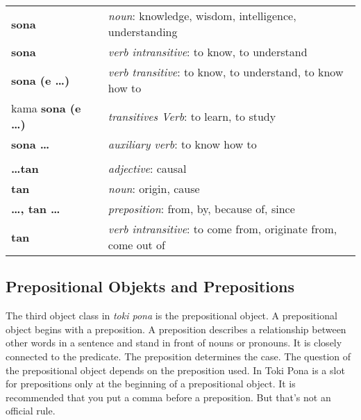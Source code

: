 \begin{supertabular}{p{2,5cm}|ll}
    \textbf{sona}                &  & \textit{noun}: knowledge, wisdom, intelligence, understanding                 \\
    \textbf{sona}                &  & \textit{verb intransitive}: to know, to understand                            \\
    \textbf{sona (e \dots)}      &  & \textit{verb transitive}: to know, to understand, to know how to              \\
    kama \textbf{sona (e \dots)} &  & \textit{transitives Verb}: to learn, to study                                 \\
    \textbf{sona \dots}          &  & \textit{auxiliary verb}: to know how to                                       \\
                                 &  &                                                                               \\
    \textbf{\dots tan}           &  & \textit{adjective}: causal                                                    \\
    \textbf{tan}                 &  & \textit{noun}: origin, cause                                                  \\
    \textbf{\dots , tan \dots}   &  & \textit{preposition}: from, by, because of, since                             \\
    \textbf{tan}                 &  & \textit{verb intransitive}: to come from, originate from, come out of         \\
\end{supertabular}

\newpage

\subsection*{Prepositional Objekts and Prepositions}
The third object class in \textit{toki pona} is the prepositional object.
A prepositional object begins with a preposition.
A preposition describes a relationship between other words in a sentence and stand in front of nouns or pronouns.
It is closely connected to the predicate.
The preposition determines the case.
The question of the prepositional object depends on the preposition used.
In Toki Pona is a slot for prepositions only at the beginning of a prepositional object.
It is recommended that you put a comma before a preposition.
But that's not an official rule.


